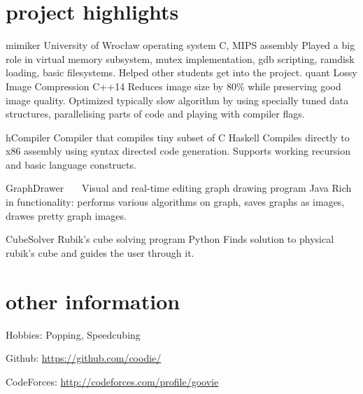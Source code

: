 \documentclass[]{twentysecondcv}
\begin{document}
\section{project highlights}
\begin{twenty}
	\twentyitem
	{mimiker}
	{University of Wrocław operating system}
	{C, MIPS assembly}
	{ Played a big role in virtual memory subsystem, mutex implementation, gdb scripting, ramdisk loading, basic filesystems. Helped other students get into the project. }
	\twentyitem
	{quant}
	{Lossy Image Compression}
	{C++14}
	{Reduces image size by 80\% while preserving good image quality.
	Optimized typically slow algorithm by using specially tuned data structures, parallelising parts of code and playing with compiler flags.
	}
	
	\twentyitem
	{hCompiler}
	{Compiler that compiles tiny subset of C}
	{Haskell}
	{Compiles directly to x86 assembly using syntax directed code generation. Supports working recursion and basic language constructs. }
	
	\twentyitem
	{GraphDrawer\ \ \ }
	{Visual and real-time editing graph drawing program}
	{Java}
	{Rich in functionality: performs various algorithms on graph, saves graphs as images, drawes pretty graph images.}
	
	\twentyitem
	{CubeSolver}
	{Rubik's cube solving program}
	{Python}
	{Finds solution to physical rubik's cube and guides the user through it. }
	
\end{twenty}


\section{other information}
Hobbies: Popping, Speedcubing

Github: \url{https://github.com/coodie/}

CodeForces: \url{http://codeforces.com/profile/goovie}


\end{document}
